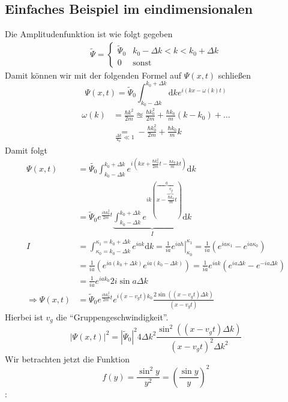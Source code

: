 \documentclass[oneside]{book}
\theoremstyle{definition}
\renewcommand{\d}{\mathrm d}
\begin{document}

\subsection{Einfaches Beispiel im eindimensionalen}
Die Amplitudenfunktion ist wie folgt gegeben
\begin{align*}
\tilde{\Psi} = \begin{cases}
\tilde{\Psi}_0 & k_0 - \Delta k < k < k_0 + \Delta k\\
0 & \text{sonst}
\end{cases}
\end{align*}
Damit können wir mit der folgenden Formel auf $\Psi(x, t)$ schließen
$$\Psi(x,t) = \tilde{\Psi}_0 \int_{k_0-\Delta k}^{k_0+\Delta k} \d k e^{i(kx - \omega(k)t)}$$
\begin{align*}
\omega(k) &= \frac{\hbar k^2}{2m} \approxeq \frac{\hbar k_0^2}{2m} + \frac{\hbar k_0}{m}(k - k_0) + \dots\\
&\underset{\frac{\Delta k}{k_0} \ll 1}{=} - \frac{\hbar k_0^2}{2m} + \frac{\hbar k_0}{m} k
\end{align*}
Damit folgt
\begin{align*}
\Psi(x,t) &= \tilde{\Psi_0} \int_{k_0 - \Delta k}^{k_0 + \Delta k} e^{i (kx + \frac{\hbar k_0^2}{2m}t - \frac{\hbar k_0}{m} k t)} \d k\\
&= \tilde{\Psi}_0  e^{\frac{i \hbar k_0^2}{2m}t}  \underbrace{\int_{k_0 - \Delta k}^{k_0 + \Delta k} e^{ik(\overbrace{x - \overbrace{\frac{\hbar k_0}{m}}^{v_g}t}^a)} \d k}_{I}\\
I &= \int_{\kappa_0 = k_0-\Delta k}^{\kappa_1 = k_0 + \Delta k} e^{iak} \d k = \left. \frac{1}{ia} e^{i a h} \right|_{\kappa_0}^{\kappa_1} = \frac1{ia} (e^{ia\kappa_1} - e^{ia\kappa_0})\\
&=\frac{1}{ia} (e^{ia(k_0 + \Delta k)} e^{ia (k_0 - \Delta k)}) = \frac{1}{ia} e^{iak} (e^{ia \Delta k} - e^{-ia \Delta k})\\
&= \frac{1}{ia} e^{ia k_0} 2 i \sin a \Delta k\\
\Rightarrow \Psi(x,t) &= \tilde{\Psi}_0 e^{\frac{i\hbar k_0^2}{2m} t} e^{i (x - v_g t) k_0} \frac{2 \sin((x - v_g t)\Delta k)}{(x - v_g t)}
\end{align*}
Hierbei ist $v_g$ die "`Gruppengeschwindigkeit"'.
$$|\Psi(x,t)|^2 = |\tilde{\Psi}_0|^2 4 \Delta k^2 \frac{\sin^2((x - v_g t)\Delta k)}{(x - v_g t)^2 \Delta k^2}$$
Wir betrachten jetzt die Funktion $$f(y) = \frac{\sin^2 y}{y^2} = \left(\frac{\sin y}{y}\right)^2$$:
\begin{center}
\end{center}
\end{document}
